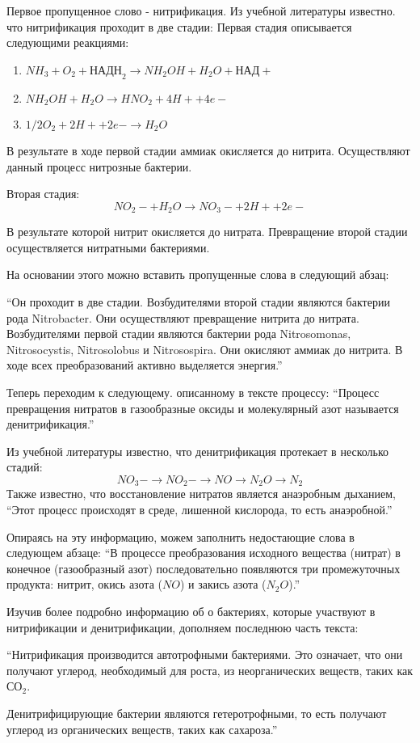 \explanationSection

Первое пропущенное слово - нитрификация. 
Из учебной литературы известно. что нитрификация проходит в две стадии:
Первая стадия описывается следующими реакциями:
\begin{enumerate}
    \item $NH_3 + O_2 + \text{НАДН}_2 \rightarrow NH_2OH + H_2O + \text{НАД}+$
    \item $NH_2OH + H_2O \rightarrow HNO_2 + 4H+ + 4e-$
    \item $1/2O_2 + 2H+ + 2e- \rightarrow H_2O$
\end{enumerate}

В результате в ходе первой стадии аммиак окисляется до нитрита. Осуществляют данный процесс нитрозные бактерии.

Вторая стадия:
$$NO_2- + H_2O \rightarrow NO_3- + 2H+ + 2e-$$

В результате которой нитрит окисляется до нитрата. Превращение второй стадии осуществляется нитратными бактериями.

На основании этого можно вставить пропущенные слова в следующий абзац:

“Он проходит в две стадии. Возбудителями второй стадии являются бактерии рода Nitrobacter. Они осуществляют превращение нитрита до нитрата. Возбудителями первой стадии являются бактерии рода Nitrosomonas, Nitrosocystis, Nitrosolobus и Nitrosospira. Они окисляют аммиак до нитрита. 
В ходе всех преобразований активно выделяется энергия.”

Теперь переходим к следующему. описанному в тексте процессу: 
“Процесс превращения нитратов в газообразные оксиды и молекулярный азот называется денитрификация.” 

Из учебной литературы известно, что денитрификация протекает в несколько стадий:
$$NO_3-\rightarrow NO_2- \rightarrow NO \rightarrow N_2O \rightarrow N_2$$
Также известно, что восстановление нитратов является анаэробным дыханием, 
“Этот процесс происходят в среде, лишенной кислорода, то есть анаэробной.”

Опираясь на эту информацию, можем заполнить недостающие слова в следующем абзаце:
“В процессе преобразования исходного вещества (нитрат) в конечное (газообразный азот) последовательно появляются три промежуточных продукта: нитрит, окись азота ($NO$) и закись азота ($N_2O$).”

Изучив более подробно информацию об о бактериях, которые участвуют в нитрификации и денитрификации, дополняем последнюю часть текста:

“Нитрификация производится автотрофными бактериями. Это означает, что они получают углерод, необходимый для роста, из неорганических веществ, таких как $СО_2$.

Денитрифицирующие бактерии являются гетеротрофными, то есть получают углерод из органических веществ, таких как сахароза.”


